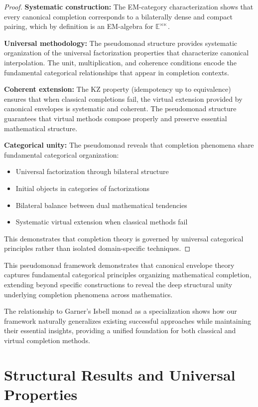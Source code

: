 \documentclass[11pt]{article}
\theoremstyle{plain}
\theoremstyle{definition}
\theoremstyle{remark}
\begin{document}
\begin{proof}
\textbf{Systematic construction:} The EM-category characterization shows that every canonical completion corresponds to a bilaterally dense and compact pairing, which by definition is an EM-algebra for $\mathbb{E}^{\rtimes \ltimes}$.

\textbf{Universal methodology:} The pseudomonad structure provides systematic organization of the universal factorization properties that characterize canonical interpolation. The unit, multiplication, and coherence conditions encode the fundamental categorical relationships that appear in completion contexts.

\textbf{Coherent extension:} The KZ property (idempotency up to equivalence) ensures that when classical completions fail, the virtual extension provided by canonical envelopes is systematic and coherent. The pseudomonad structure guarantees that virtual methods compose properly and preserve essential mathematical structure.

\textbf{Categorical unity:} The pseudomonad reveals that completion phenomena share fundamental categorical organization:
\begin{itemize}
\item Universal factorization through bilateral structure
\item Initial objects in categories of factorizations
\item Bilateral balance between dual mathematical tendencies
\item Systematic virtual extension when classical methods fail
\end{itemize}

This demonstrates that completion theory is governed by universal categorical principles rather than isolated domain-specific techniques.
\end{proof}

This pseudomonad framework demonstrates that canonical envelope theory captures fundamental categorical principles organizing mathematical completion, extending beyond specific constructions to reveal the deep structural unity underlying completion phenomena across mathematics.

The relationship to Garner's Isbell monad as a specialization shows how our framework naturally generalizes existing successful approaches while maintaining their essential insights, providing a unified foundation for both classical and virtual completion methods.

\section{Structural Results and Universal Properties}
\end{document}
